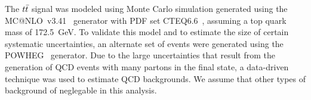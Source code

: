 


The $t\bar{t}$ signal was modeled using Monte Carlo simulation generated using the {\sc MC@NLO}~v3.41~\cite{FRI-0201} 
generator with PDF set CTEQ6.6~\cite{Nadolsky:2008zw}, assuming a top quark mass of 172.5~GeV.
To validate this model and to estimate the size of certain systematic uncertainties, an alternate set of events were 
generated using the {\sc POWHEG}~\cite{FRI-0701} generator.
Due to the large uncertainties that result from the generation of QCD events with many partons in the final state, 
a data-driven technique was used to estimate QCD backgrounds.
We assume that other types of background of neglegable in this analysis.





